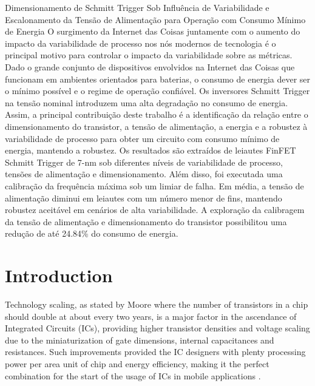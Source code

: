 \documentclass[pgmicro,mestrado,english]{iiufrgs}
\begin{document}
\begin{englishabstract}
{
Dimensionamento de Schmitt Trigger Sob Influência de Variabilidade e Escalonamento da Tensão de Alimentação para Operação com Consumo Mínimo de Energia
}
{
O surgimento da Internet das Coisas juntamente com o aumento do impacto da variabilidade de processo nos nós modernos de tecnologia é o principal motivo para controlar o impacto da variabilidade sobre as métricas. Dado o grande conjunto de dispositivos envolvidos na Internet das Coisas que funcionam em ambientes orientados para baterias, o consumo de energia dever ser o mínimo possível e o regime de operação confiável. Os inversores Schmitt Trigger na tensão nominal introduzem uma alta degradação no consumo de energia. Assim, a principal contribuição deste trabalho é a identificação da relação entre o dimensionamento do transistor, a tensão de alimentação, a energia e a robustez à variabilidade de processo para obter um circuito com consumo mínimo de energia, mantendo a robustez. Os resultados são extraídos de leiautes FinFET Schmitt Trigger de 7-nm sob diferentes níveis de variabilidade de processo, tensões de alimentação e dimensionamento. Além disso, foi executada uma calibração da frequência máxima sob um limiar de falha. Em média, a tensão de alimentação diminui em leiautes com um número menor de fins, mantendo robustez aceitável em cenários de alta variabilidade. A exploração da calibragem da tensão de alimentação e dimensionamento do transistor possibilitou uma redução de até 24.84\% do consumo de energia.
}
\end{englishabstract}

\tableofcontents

\chapter{Introduction}
	Technology scaling, as stated by Moore where the number of transistors in a chip should double at about every two years, is a major factor in the ascendance of Integrated Circuits (ICs), providing higher transistor densities and voltage scaling due to the miniaturization of gate dimensions, internal capacitances and resistances. Such improvements provided the IC designers with plenty processing power per area unit of chip and energy efficiency, making it the perfect combination for the start of the usage of ICs in mobile applications \cite{islam:10}.
\end{document}
